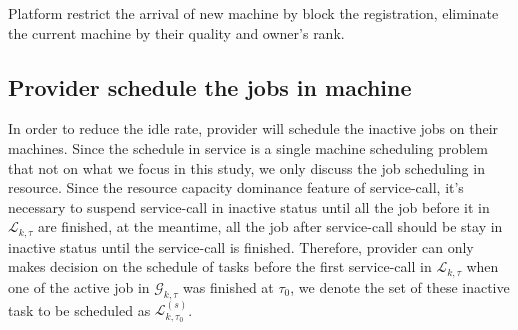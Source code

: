 Platform restrict the arrival of new machine by block the registration, eliminate the current machine by their quality and owner's rank.




\subsection{Provider schedule the jobs in machine} %
\label{sub:schedule_the_jobs_in_machine}
In order to reduce the idle rate, provider will schedule the inactive jobs on their machines. Since the schedule in service is a single machine scheduling problem that not on  what we focus in this study, we only discuss the job scheduling in resource. Since the  resource capacity dominance feature of service-call, it's necessary to suspend service-call in inactive status until all the job before it in $\mathcal{L}_{k,\tau}$ are finished, at the meantime, all the job after service-call should be stay in inactive status until the service-call is finished.
Therefore, provider can only makes decision on the schedule of tasks before the first service-call in $\mathcal{L}_{k,\tau}$ when one of the active job in $\mathcal{G}_{k,\tau}$ was finished at $\tau_0$, we denote the set of these inactive task to be scheduled as $\mathcal{L}^{(s)}_{k,\tau_0}$.

